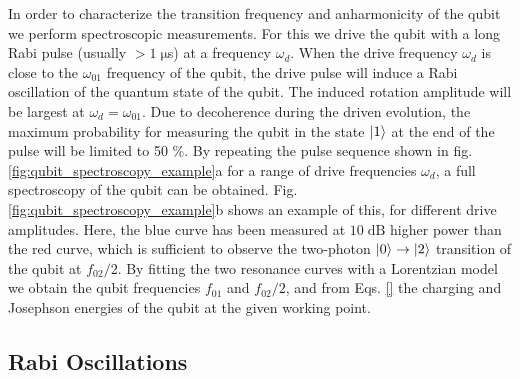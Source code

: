 In order to characterize the transition frequency and anharmonicity of the qubit we perform spectroscopic measurements. For this we drive the qubit with a long Rabi pulse (usually $> 1\;\mathrm{\mu}$s) at a frequency $\omega_d$. When the drive frequency $\omega_{d}$ is close to the $\omega_{01}$ frequency of the qubit, the drive pulse will induce a Rabi oscillation of the quantum state of the qubit. The induced rotation amplitude will be largest at $\omega_d=\omega_{01}$. Due to decoherence during the driven evolution, the maximum probability for measuring the qubit in the state $\left| 1 \right>$ at the end of the pulse will be limited to 50 \%. By repeating the pulse sequence shown in fig. \ref{fig:qubit_spectroscopy_example}a for a range of drive frequencies $\omega_d$, a full spectroscopy of the qubit can be obtained. Fig. \ref{fig:qubit_spectroscopy_example}b shows an example of this, for different drive amplitudes. Here, the blue curve has been measured at $10\;\mathrm{dB}$ higher power than the red curve, which is sufficient to observe the two-photon $\left| 0 \right>\to\left| 2 \right>$ transition of the qubit at $f_{02}/2$. By fitting the two resonance curves with a Lorentzian model we obtain the qubit frequencies $f_{01}$ and $f_{02}/2$, and from Eqs. \ref{} the charging and Josephson energies of the qubit at the given working point.

\subsection{Rabi Oscillations} \label{section:qubit_rabi}

